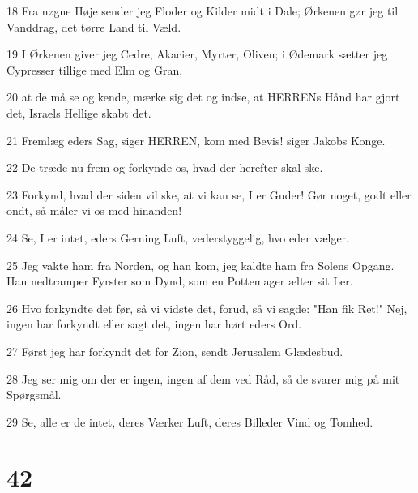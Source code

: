 \par 18 Fra nøgne Høje sender jeg Floder og Kilder midt i Dale; Ørkenen gør jeg til Vanddrag, det tørre Land til Væld.
\par 19 I Ørkenen giver jeg Cedre, Akacier, Myrter, Oliven; i Ødemark sætter jeg Cypresser tillige med Elm og Gran,
\par 20 at de må se og kende, mærke sig det og indse, at HERRENs Hånd har gjort det, Israels Hellige skabt det.
\par 21 Fremlæg eders Sag, siger HERREN, kom med Bevis! siger Jakobs Konge.
\par 22 De træde nu frem og forkynde os, hvad der herefter skal ske.
\par 23 Forkynd, hvad der siden vil ske, at vi kan se, I er Guder! Gør noget, godt eller ondt, så måler vi os med hinanden!
\par 24 Se, I er intet, eders Gerning Luft, vederstyggelig, hvo eder vælger.
\par 25 Jeg vakte ham fra Norden, og han kom, jeg kaldte ham fra Solens Opgang. Han nedtramper Fyrster som Dynd, som en Pottemager ælter sit Ler.
\par 26 Hvo forkyndte det før, så vi vidste det, forud, så vi sagde: "Han fik Ret!" Nej, ingen har forkyndt eller sagt det, ingen har hørt eders Ord.
\par 27 Først jeg har forkyndt det for Zion, sendt Jerusalem Glædesbud.
\par 28 Jeg ser mig om der er ingen, ingen af dem ved Råd, så de svarer mig på mit Spørgsmål.
\par 29 Se, alle er de intet, deres Værker Luft, deres Billeder Vind og Tomhed.

\chapter{42}

